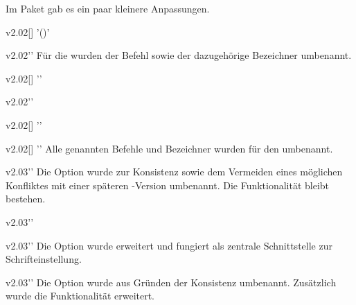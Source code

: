 %
Im Paket  gab es ein paar kleinere Anpassungen.
\begin{Entity}{}
\begin{Obsolete}{v2.02}{[]}%
  '()'
\begin{Obsolete}{v2.02}{}''
\printdeclarationlist%
%
Für die \taskname{} wurden der Befehl sowie der dazugehörige Bezeichner 
umbenannt.
\end{Obsolete}
\end{Obsolete}

\begin{Obsolete}{v2.02}{[]}%
  ''
\begin{Obsolete}{v2.02}{}''
\begin{Obsolete}{v2.02}{[]}%
  ''
\begin{Obsolete}{v2.02}{[]}%
  ''
\printdeclarationlist%
%
Alle genannten Befehle und Bezeichner wurden für den \noticename{} umbenannt.
\end{Obsolete}
\end{Obsolete}
\end{Obsolete}
\end{Obsolete}
\end{Entity}


%
\begin{Obsolete}{v2.03}{}''
\printdeclarationlist%
%
Die Option  wurde zur Konsistenz sowie dem Vermeiden 
eines möglichen Konfliktes mit einer späteren \KOMAScript-Version umbenannt. 
Die Funktionalität bleibt bestehen.
\end{Obsolete}

\begin{Obsolete}{v2.03}{}''
\begin{Obsolete}{v2.03}{}''
\printdeclarationlist%
%
Die Option  wurde erweitert und fungiert als zentrale 
Schnittstelle zur Schrifteinstellung. 
\end{Obsolete}
\end{Obsolete}

\begin{Obsolete}{v2.03}{}''
\printdeclarationlist%
%
Die Option  wurde aus Gründen der Konsistenz umbenannt. 
Zusätzlich wurde die Funktionalität erweitert.
\end{Obsolete}

